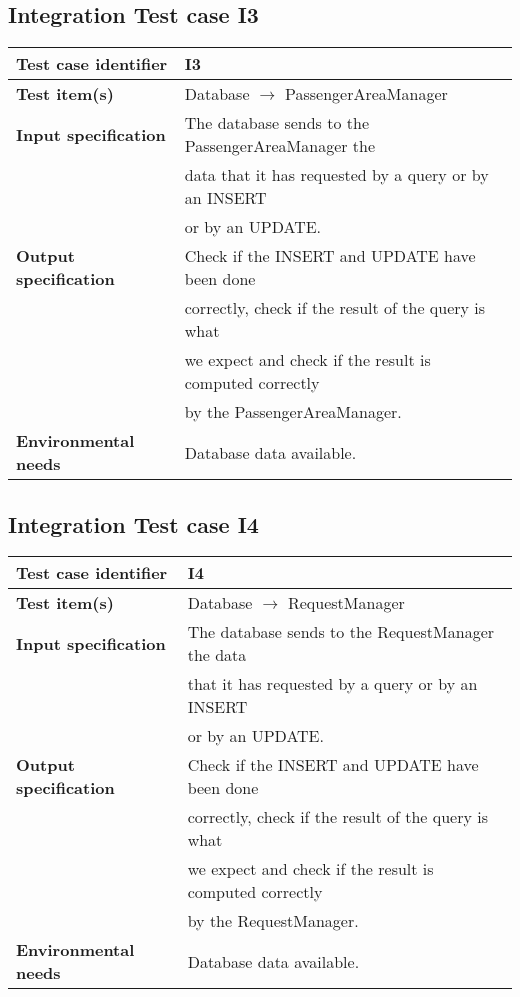 \documentclass[18pt,oneside,a4paper, titlepage]{article}
\begin{document}
	\subsection{Integration Test case I3}
		\begin{tabular}{ l l}
			\hline 		\textbf{Test case identifier} & I3 \\
			\hline		\textbf{Test item(s)}  & Database $\rightarrow$ PassengerAreaManager \\
			\hline		\textbf{Input specification} & The database sends to the PassengerAreaManager the\\ & data that it has requested by a query or by an INSERT \\ & or by an UPDATE.\\
			\hline		\textbf{Output specification} & Check if the INSERT and UPDATE have been done\\ & correctly, check if the result of the query is what\\ &  we expect and check if the result is computed correctly\\ & by the PassengerAreaManager.\\
			\hline		\textbf{Environmental needs} &  Database data available.\\
			\hline
		\end{tabular}
	\subsection{Integration Test case I4}
		\begin{tabular}{ l l}
			\hline 		\textbf{Test case identifier} & I4 \\
			\hline		\textbf{Test item(s)}  & Database $\rightarrow$ RequestManager \\
			\hline		\textbf{Input specification} & The database sends to the RequestManager the data\\ & that it has requested by a query or by an INSERT \\ & or by an UPDATE.\\
			\hline		\textbf{Output specification} &  Check if the INSERT and UPDATE have been done\\ & correctly, check if the result of the query is what\\ &  we expect and check if the result is computed correctly\\ & by the RequestManager.\\
			\hline		\textbf{Environmental needs} & Database data available.\\
			\hline
		\end{tabular}
\end{document}

